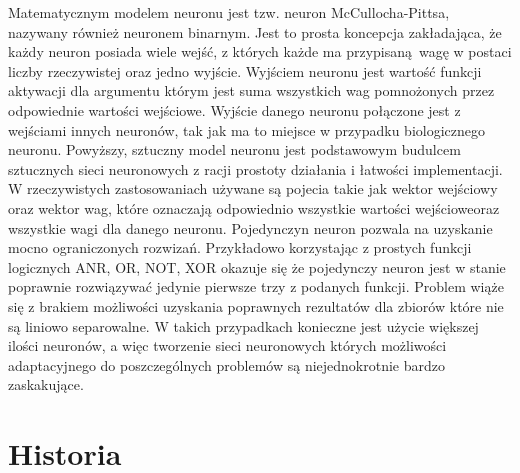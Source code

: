 Matematycznym modelem neuronu jest tzw. neuron McCullocha-Pittsa, nazywany
również neuronem binarnym. Jest to prosta koncepcja zakładająca, że każdy neuron
posiada wiele wejść, z których każde ma przypisaną wagę w postaci liczby
rzeczywistej oraz jedno wyjście. Wyjściem neuronu jest wartość funkcji aktywacji
dla argumentu którym jest suma wszystkich wag pomnożonych przez odpowiednie
wartości wejściowe. Wyjście danego neuronu połączone jest z wejściami innych
neuronów, tak jak ma to miejsce w przypadku biologicznego neuronu.
Powyższy, sztuczny model neuronu jest podstawowym budulcem sztucznych sieci
neuronowych z racji prostoty działania i łatwości implementacji.
W rzeczywistych zastosowaniach używane są pojecia takie jak wektor wejściowy
oraz wektor wag, które oznaczają odpowiednio wszystkie wartości wejścioweoraz
wszystkie wagi dla danego neuronu.
Pojedynczyn neuron pozwala na uzyskanie mocno ograniczonych rozwizań. Przykładowo
korzystając z prostych funkcji logicznych ANR, OR, NOT, XOR okazuje się że
pojedynczy neuron jest w stanie poprawnie rozwiązywać jedynie pierwsze trzy z
podanych funkcji. Problem wiąże się z brakiem możliwości uzyskania poprawnych
rezultatów dla zbiorów które nie są liniowo separowalne. W takich przypadkach
konieczne jest użycie większej ilości neuronów, a więc tworzenie sieci neuronowych
których możliwości adaptacyjnego do poszczególnych problemów są niejednokrotnie
bardzo zaskakujące.


\section {Historia}
